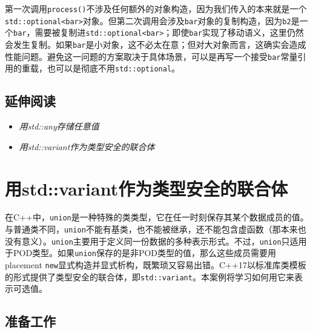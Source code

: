 
第一次调用\texttt{process()}不涉及任何额外的对象构造，因为我们传入的本来就是一个\texttt{std::\allowbreak{}optional<\allowbreak{}bar>}对象。但第二次调用会涉及\texttt{bar}对象的复制构造，因为\texttt{b2}是一个\texttt{bar}，需要被复制进\texttt{std::\allowbreak{}optional<\allowbreak{}bar>}；即使\texttt{bar}实现了移动语义，这里仍然会发生复制。如果\texttt{bar}是小对象，这不必太在意；但对大对象而言，这确实会造成性能问题。避免这一问题的方案取决于具体场景，可以是再写一个接受\texttt{bar}常量引用的重载，也可以是彻底不用\texttt{std::\allowbreak{}optional}。



\subsection{延伸阅读}



\begin{itemize}
\item \textit{用std::any存储任意值}



\item \textit{用std::variant作为类型安全的联合体}

\end{itemize}



\section{用std::variant作为类型安全的联合体}



在C++中，\texttt{union}是一种特殊的类类型，它在任一时刻保存其某个数据成员的值。与普通类不同，\texttt{union}不能有基类，也不能被继承，还不能包含虚函数（那本来也没有意义）。\texttt{union}主要用于定义同一份数据的多种表示形式。不过，\texttt{union}只适用于POD类型。如果\texttt{union}保存的是非POD类型的值，那么这些成员需要用placement \texttt{new}显式构造并显式析构，既繁琐又容易出错。C++17以标准库类模板的形式提供了类型安全的联合体，即\texttt{std::\allowbreak{}variant}。本案例将学习如何用它来表示可选值。



\subsection{准备工作}


